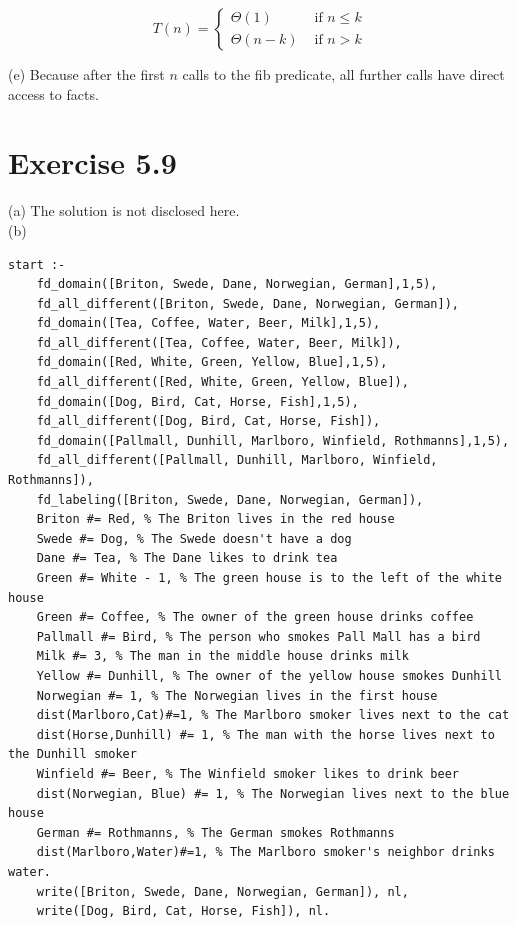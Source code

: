 \documentclass[10pt]{book}
\begin{document}
$$
T(n)= \begin{cases}\Theta(1) & \text { if } n \leq k \\ \Theta(n-k) & \text { if } n>k\end{cases}
$$

(e) Because after the first $n$ calls to the fib predicate, all further calls have direct access to facts.

\section*{Exercise 5.9}
(a) The solution is not disclosed here.\\
(b)

\begin{verbatim}
start :-
    fd_domain([Briton, Swede, Dane, Norwegian, German],1,5),
    fd_all_different([Briton, Swede, Dane, Norwegian, German]),
    fd_domain([Tea, Coffee, Water, Beer, Milk],1,5),
    fd_all_different([Tea, Coffee, Water, Beer, Milk]),
    fd_domain([Red, White, Green, Yellow, Blue],1,5),
    fd_all_different([Red, White, Green, Yellow, Blue]),
    fd_domain([Dog, Bird, Cat, Horse, Fish],1,5),
    fd_all_different([Dog, Bird, Cat, Horse, Fish]),
    fd_domain([Pallmall, Dunhill, Marlboro, Winfield, Rothmanns],1,5),
    fd_all_different([Pallmall, Dunhill, Marlboro, Winfield, Rothmanns]),
    fd_labeling([Briton, Swede, Dane, Norwegian, German]),
    Briton #= Red, % The Briton lives in the red house
    Swede #= Dog, % The Swede doesn't have a dog
    Dane #= Tea, % The Dane likes to drink tea
    Green #= White - 1, % The green house is to the left of the white house
    Green #= Coffee, % The owner of the green house drinks coffee
    Pallmall #= Bird, % The person who smokes Pall Mall has a bird
    Milk #= 3, % The man in the middle house drinks milk
    Yellow #= Dunhill, % The owner of the yellow house smokes Dunhill
    Norwegian #= 1, % The Norwegian lives in the first house
    dist(Marlboro,Cat)#=1, % The Marlboro smoker lives next to the cat
    dist(Horse,Dunhill) #= 1, % The man with the horse lives next to the Dunhill smoker
    Winfield #= Beer, % The Winfield smoker likes to drink beer
    dist(Norwegian, Blue) #= 1, % The Norwegian lives next to the blue house
    German #= Rothmanns, % The German smokes Rothmanns
    dist(Marlboro,Water)#=1, % The Marlboro smoker's neighbor drinks water.
    write([Briton, Swede, Dane, Norwegian, German]), nl,
    write([Dog, Bird, Cat, Horse, Fish]), nl.
\end{verbatim}
\end{document}
